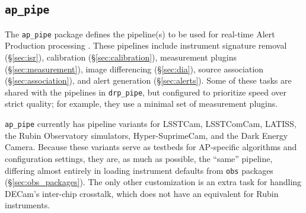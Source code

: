 \subsection{\texttt{ap\_pipe}}
\label{sec:ap_pipe}

The \texttt{ap\_pipe} package defines the pipeline(s) to be used for real-time Alert Production processing \citep{DMTN-219}.
These pipelines include instrument signature removal (\S\ref{sec:isr}), calibration (\S\ref{sec:calibration}), measurement plugins (\S\ref{sec:measurement}), image differencing (\S\ref{sec:dia}), source association (\S\ref{sec:association}), and alert generation (\S\ref{sec:alerts}).
Some of these tasks are shared with the pipelines in \texttt{drp\_pipe}, but configured to prioritize speed over strict quality; for example, they use a minimal set of measurement plugins.

\texttt{ap\_pipe} currently has pipeline variants for LSSTCam, LSSTComCam, LATISS, the Rubin Observatory simulators, Hyper-SuprimeCam, and the Dark Energy Camera.
Because these variants serve as testbeds for AP-specific algorithms and configuration settings, they are, as much as possible, the ``same'' pipeline, differing almost entirely in loading instrument defaults from \texttt{obs} packages (\S\ref{sec:obs_packages}).
The only other customization is an extra task for handling DECam's inter-chip crosstalk, which does not have an equivalent for Rubin instruments.
